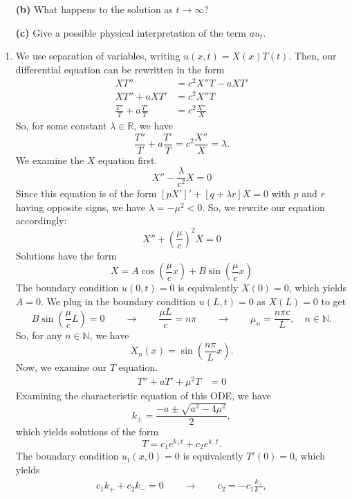 \documentclass[10pt,letterpaper]{report}
\newcommand{\R}{\mathbb{R}}
\newcommand{\N}{\mathbb{N}}
\newcommand{\so}{\qquad \rightarrow \qquad}
\begin{document}
\begin{enumerate}
\begin{qbox}
\begin{itemize}
    \item[\textbf{(b)}] What happens to the solution as $t \to \infty$?
    
    \item[\textbf{(c)}] Give a possible physical interpretation of the term $au_t$.
\end{itemize}
\end{qbox}

\begin{enumerate}
    \item We use separation of variables, writing $u(x, t) = X(x)T(t)$. Then, our differential equation can be rewritten in the form
    \begin{align*}
        XT'' &= c^2 X''T - aXT'
        \\
        XT'' + aXT' &= c^2 X''T
        \\
        \frac{T''}{T} + a\frac{T'}{T} &= c^2\frac{X''}{X}
    \end{align*}
    So, for some constant $\lambda \in \R$, we have
    \[
    \frac{T''}{T} + a\frac{T'}{T} = c^2\frac{X''}{X} = \lambda.
    \]
    We examine the $X$ equation first.
    \[
    X'' - \frac{\lambda}{c^2}X = 0
    \]
    Since this equation is of the form $\left[p X'\right]' + [q + \lambda r]X = 0$ with $p$ and $r$ having opposite signs, we have $\lambda = -\mu^2 < 0$. So, we rewrite our equation accordingly:
    \[
    X'' + \left(\frac{\mu}{c}\right)^2X = 0
    \]
    Solutions have the form
    \[
    X = A\cos\left(\frac{\mu}{c}x\right) + B\sin\left(\frac{\mu}{c}x\right)
    \]
    The boundary condition $u(0, t) = 0$ is equivalently $X(0) = 0$, which yields $A = 0$. We plug in the boundary condition $u(L, t) = 0$ as $X(L) = 0$ to get
    \[
    B\sin\left(\frac{\mu}{c}L\right) = 0 \so \frac{\mu L}{c} = n\pi \so \mu_n = \frac{n\pi c}{L}, \quad n \in \N.
    \]
    So, for any $n \in \N$, we have
    \[
    X_n(x) = \sin\left(\frac{n\pi}{L}x\right).
    \]
    Now, we examine our $T$ equation.
    \begin{align*}
        T'' + aT' + \mu^2 T &= 0
    \end{align*}
    Examining the characteristic equation of this ODE, we have
    \[
    k_\pm = \frac{-a \pm \sqrt{a^2 - 4\mu^2}}{2},
    \]
    which yields solutions of the form
    \[
    T = c_1e^{k_+ t} + c_2e^{k_- t}.
    \]
    The boundary condition $u_t(x, 0) = 0$ is equivalently $T'(0) = 0$, which yields
    \begin{align*}
        c_1k_+ + c_2 k_- = 0 \so
        c_2 = -c_1\frac{k_+}{k_-},
    \end{align*}

\end{enumerate}
\end{enumerate}
\end{document}
